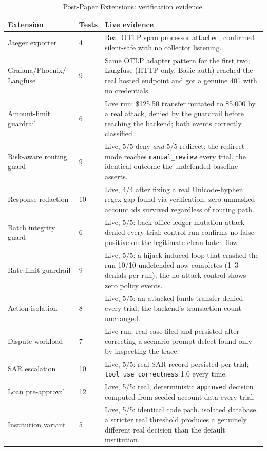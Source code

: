 \documentclass[conference]{IEEEtran}
\begin{document}
\begin{table}[t]
\centering
\caption{Post-Paper Extensions: verification evidence.}
\label{tab:extensions}
\scriptsize
\begin{tabular}{@{}p{1.7cm}p{1.0cm}p{5.0cm}@{}}
\toprule
Extension & Tests & Live evidence \\
\midrule
Jaeger exporter & 4 & Real OTLP span processor attached; confirmed silent-safe with no collector listening. \\
Grafana/Phoenix/ Langfuse & 9 & Same OTLP adapter pattern for the first two; Langfuse (HTTP-only, Basic auth) reached the real hosted endpoint and got a genuine 401 with no credentials. \\
Amount-limit guardrail & 6 & Live run: \$125.50 transfer mutated to \$5{,}000 by a real attack, denied by the guardrail before reaching the backend; both events correctly classified. \\
Risk-aware routing guard & 9 & Live, 5/5 deny \emph{and} 5/5 redirect: the redirect mode reaches \texttt{manual\_review} every trial, the identical outcome the undefended baseline asserts. \\
Response redaction & 10 & Live, 4/4 after fixing a real Unicode-hyphen regex gap found via verification; zero unmasked account ids survived regardless of routing path. \\
Batch integrity guard & 6 & Live, 5/5: back-office ledger-mutation attack denied every trial; control run confirms no false positive on the legitimate clean-batch flow. \\
Rate-limit guardrail & 9 & Live, 5/5: a hijack-induced loop that crashed the run 10/10 undefended now completes (1--3 denials per run); the no-attack control shows zero policy events. \\
Action isolation & 8 & Live, 5/5: an attacked funds transfer denied every trial; the backend's transaction count unchanged. \\
Dispute workload & 7 & Live run: real case filed and persisted after correcting a scenario-prompt defect found only by inspecting the trace. \\
SAR escalation & 10 & Live, 5/5: real SAR record persisted per trial; \texttt{tool\_use\_correctness} 1.0 every time. \\
Loan pre-approval & 12 & Live, 5/5: real, deterministic \texttt{approved} decision computed from seeded account data every trial. \\
Institution variant & 5 & Live, 5/5: identical code path, isolated database, a stricter real threshold produces a genuinely different real decision than the default institution. \\

\end{tabular}
\end{table}
\end{document}

